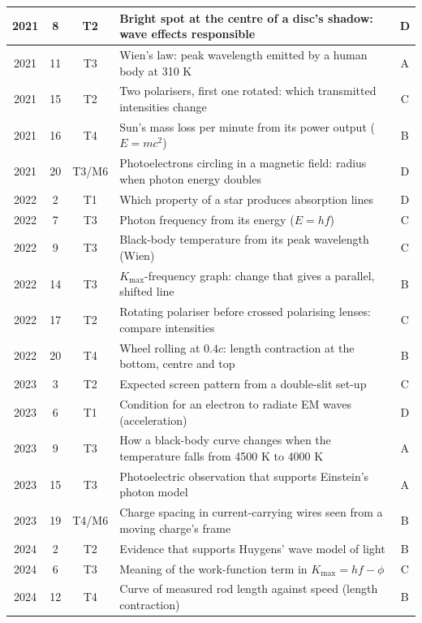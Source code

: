 \documentclass[12pt]{article}
\begin{document}
{\begin{longtable}{|c|c|c|p{108mm}|c|}
    2021 & 8 & T2 & Bright spot at the centre of a disc's shadow: wave effects responsible & D\\ \hline
    2021 & 11 & T3 & Wien's law: peak wavelength emitted by a human body at 310 K & A\\ \hline
    2021 & 15 & T2 & Two polarisers, first one rotated: which transmitted intensities change & C\\ \hline
    2021 & 16 & T4 & Sun's mass loss per minute from its power output ($E = mc^2$) & B\\ \hline
    2021 & 20 & T3/\allowbreak M6 & Photoelectrons circling in a magnetic field: radius when photon energy doubles & D\\ \hline
    2022 & 2 & T1 & Which property of a star produces absorption lines & D\\ \hline
    2022 & 7 & T3 & Photon frequency from its energy ($E = hf$) & C\\ \hline
    2022 & 9 & T3 & Black-body temperature from its peak wavelength (Wien) & C\\ \hline
    2022 & 14 & T3 & $K_\mathrm{max}$-frequency graph: change that gives a parallel, shifted line & B\\ \hline
    2022 & 17 & T2 & Rotating polariser before crossed polarising lenses: compare intensities & C\\ \hline
    2022 & 20 & T4 & Wheel rolling at $0.4c$: length contraction at the bottom, centre and top & B\\ \hline
    2023 & 3 & T2 & Expected screen pattern from a double-slit set-up & C\\ \hline
    2023 & 6 & T1 & Condition for an electron to radiate EM waves (acceleration) & D\\ \hline
    2023 & 9 & T3 & How a black-body curve changes when the temperature falls from 4500 K to 4000 K & A\\ \hline
    2023 & 15 & T3 & Photoelectric observation that supports Einstein's photon model & A\\ \hline
    2023 & 19 & T4/\allowbreak M6 & Charge spacing in current-carrying wires seen from a moving charge's frame & B\\ \hline
    2024 & 2 & T2 & Evidence that supports Huygens' wave model of light & B\\ \hline
    2024 & 6 & T3 & Meaning of the work-function term in $K_\mathrm{max} = hf - \phi$ & C\\ \hline
    2024 & 12 & T4 & Curve of measured rod length against speed (length contraction) & B\\ \hline

\end{longtable}}
\end{document}
